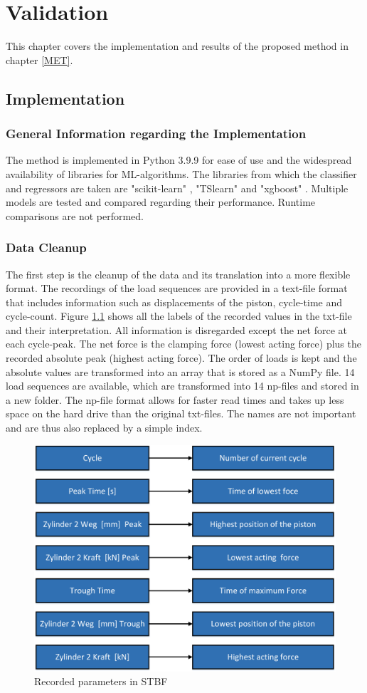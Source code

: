 \chapter{Validation}
This chapter covers the implementation and results of the proposed method in chapter \ref{MET}.

\section{Implementation}
\subsection{General Information regarding the Implementation}
The method is implemented in Python 3.9.9 for ease of use and the widespread availability of libraries for ML-algorithms.
The libraries from which the classifier and regressors are taken are "scikit-learn" \cite{SKlearn}, "TSlearn" \cite{tslearn} and "xgboost" \cite{XG}.
Multiple models are tested and compared regarding their performance. Runtime comparisons are not performed.
\subsection{Data Cleanup}
The first step is the cleanup of the data and its translation into a more flexible format. The recordings of the load sequences are provided in a text-file format that includes information such as displacements of the piston, cycle-time and cycle-count.
Figure \ref{fig:recordinglabel} shows all the labels of the recorded values in the txt-file and their interpretation. All information is disregarded except the net force at each cycle-peak. The net force is the clamping force (lowest acting force) plus the recorded absolute peak (highest acting force). The order of loads is kept and the absolute values are transformed into an array that is stored as a NumPy file. 14 load sequences are available, which are transformed into 14 np-files and stored in a new folder. The np-file format allows for faster read times and takes up less space on the hard drive than the original txt-files. The names are not important and are thus also replaced by a simple index.


\begin{figure}[H]
	\centering
	\includegraphics[width=0.75\linewidth]{IMGs/recordinglabel.png}
	\caption{Recorded parameters in STBF}
	\label{fig:recordinglabel}
\end{figure}

